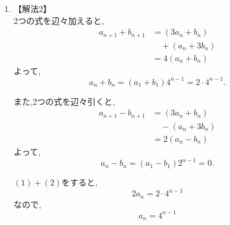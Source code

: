 \begin{enumerate}[label=(\arabic*),parsep=3pt]
\begin{enumerate}
                  2式を辺々加えると,
                  \[
                    2a_n=2\cdot4^{n-1}
                  \]
                  であるから,
                  \[
                    a_n=4^{n-1}
                  \]
                  また,
                  \[
                    b_n=a_n=4^{n-1}
                  \]
            \item 【解法2】\\
                  2つの式を辺々加えると,
                  \begin{align*}
                    a_{n+1}+b_{n+1}
                      &=(3a_n+b_n)\\
                      &\quad +(a_n+3b_n)\\
                      &=4(a_n+b_n)
                  \end{align*}
                  よって,
                  \[
                    a_n+b_n=(a_1+b_1)4^{n-1}=2\cdot4^{n-1}. \tag*{\(\cdots\) (1)}
                  \]

                  また,2つの式を辺々引くと,
                  \begin{align*}
                    a_{n+1}-b_{n+1}
                      &=(3a_n+b_n)\\
                      &\quad -(a_n+3b_n)\\
                      &=2(a_n-b_n)
                  \end{align*}
                  よって,
                  \[
                    a_n-b_n=(a_1-b_1)2^{n-1}=0. \tag*{\(\cdots\) (2)}
                  \]

                  \((1)+(2)\)をすると,
                  \[
                    2a_n=2\cdot4^{n-1}
                  \]
                  なので,
                  \[
                    a_n=4^{n-1}
                  \]


\end{enumerate}
\end{enumerate}
